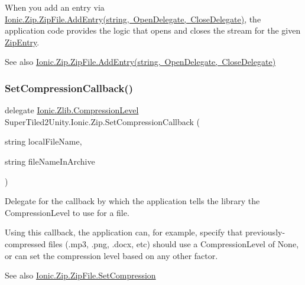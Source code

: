 When you add an entry via \mbox{\hyperlink{class_super_tiled2_unity_1_1_ionic_1_1_zip_1_1_zip_file_aca70604c3928ce13d5028d31b7d491fd}{Ionic.\+Zip.\+Zip\+File.\+Add\+Entry(string,
  Open\+Delegate, Close\+Delegate)}}, the application code provides the logic that opens and closes the stream for the given \mbox{\hyperlink{class_super_tiled2_unity_1_1_ionic_1_1_zip_1_1_zip_entry}{Zip\+Entry}}. 

\begin{DoxySeeAlso}{See also}
\mbox{\hyperlink{class_super_tiled2_unity_1_1_ionic_1_1_zip_1_1_zip_file_aca70604c3928ce13d5028d31b7d491fd}{Ionic.\+Zip.\+Zip\+File.\+Add\+Entry(string, Open\+Delegate, Close\+Delegate)}}


\end{DoxySeeAlso}
\mbox{\label{namespace_super_tiled2_unity_1_1_ionic_1_1_zip_ab6b15a72531220e6f98c46b594c9a849}} 
\subsubsection{\texorpdfstring{Set\+Compression\+Callback()}{SetCompressionCallback()}}
{\footnotesize\ttfamily delegate \mbox{\hyperlink{namespace_super_tiled2_unity_1_1_ionic_1_1_zlib_a20f6771804996c363f454ad9765cd7db}{Ionic.\+Zlib.\+Compression\+Level}} Super\+Tiled2\+Unity.\+Ionic.\+Zip.\+Set\+Compression\+Callback (\begin{DoxyParamCaption}\item[{string}]{local\+File\+Name,  }\item[{string}]{file\+Name\+In\+Archive }\end{DoxyParamCaption})}



Delegate for the callback by which the application tells the library the Compression\+Level to use for a file. 

Using this callback, the application can, for example, specify that previously-\/compressed files (.mp3, .png, .docx, etc) should use a {\ttfamily Compression\+Level} of {\ttfamily None}, or can set the compression level based on any other factor. 

\begin{DoxySeeAlso}{See also}
\mbox{\hyperlink{class_super_tiled2_unity_1_1_ionic_1_1_zip_1_1_zip_file_abd6bdba1b63a17f284509bbc0fb66637}{Ionic.\+Zip.\+Zip\+File.\+Set\+Compression}}


\end{DoxySeeAlso}
\mbox{\label{namespace_super_tiled2_unity_1_1_ionic_1_1_zip_aa3bc35e889c4343c0028b310499c6886}} 
